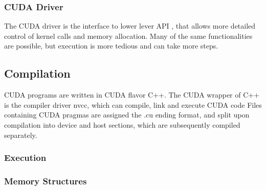 \subsubsection{CUDA Driver}
The CUDA driver is the interface to lower lever API , that allows more detailed control
of kernel calls and memory allocation. Many of the same functionalities are possible,
but execution is more tedious and can take more steps.


\subsection{Compilation}

CUDA programs are written in CUDA flavor C++.  The CUDA wrapper of C++ is the
compiler driver nvcc, which can compile, link and execute CUDA code
Files containing CUDA pragmas are assigned the .cu ending format, and split upon
compilation into device and host sections, which are subsequently compiled separately.

\subsubsection{Execution}

\subsubsection{Memory Structures}
